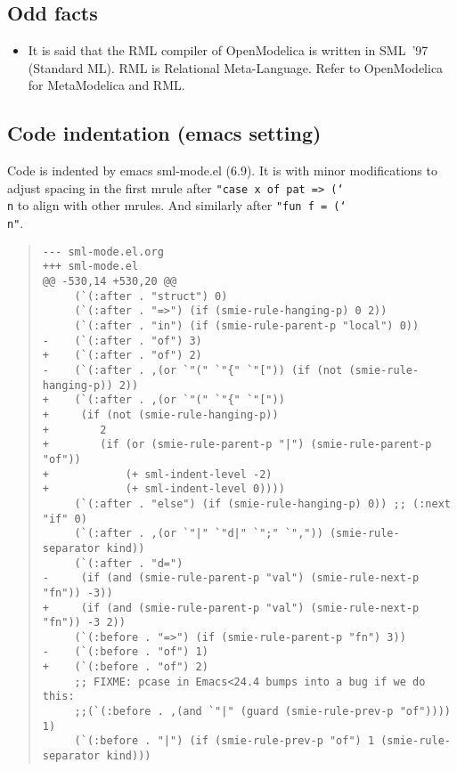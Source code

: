 \documentclass[10pt,b5paper]{article}
\begin{document}
\subsection{Odd facts}

\begin{itemize}

\item It is said that the RML compiler of OpenModelica is written in
SML~'97 (Standard ML).  RML is Relational Meta-Language.  Refer to
OpenModelica for MetaModelica and RML.

\end{itemize}

\subsection{Code indentation (emacs setting)}

Code is indented by emacs sml-mode.el (6.9).  It is with minor
modifications to adjust spacing in the first mrule after
{\tt{}"case~x~of~pat~=>~({\char`\\}n} to align with other mrules.  And
similarly after {\tt{}"fun~f~=~({\char`\\}n"}.

\begin{quote}
\small
\begin{lstlisting}[aboveskip=-\baselineskip]
--- sml-mode.el.org
+++ sml-mode.el
@@ -530,14 +530,20 @@
     (`(:after . "struct") 0)
     (`(:after . "=>") (if (smie-rule-hanging-p) 0 2))
     (`(:after . "in") (if (smie-rule-parent-p "local") 0))
-    (`(:after . "of") 3)
+    (`(:after . "of") 2)
-    (`(:after . ,(or `"(" `"{" `"[")) (if (not (smie-rule-hanging-p)) 2))
+    (`(:after . ,(or `"(" `"{" `"["))
+     (if (not (smie-rule-hanging-p))
+        2
+        (if (or (smie-rule-parent-p "|") (smie-rule-parent-p "of"))
+            (+ sml-indent-level -2)
+            (+ sml-indent-level 0))))
     (`(:after . "else") (if (smie-rule-hanging-p) 0)) ;; (:next "if" 0)
     (`(:after . ,(or `"|" `"d|" `";" `",")) (smie-rule-separator kind))
     (`(:after . "d=")
-     (if (and (smie-rule-parent-p "val") (smie-rule-next-p "fn")) -3))
+     (if (and (smie-rule-parent-p "val") (smie-rule-next-p "fn")) -3 2))
     (`(:before . "=>") (if (smie-rule-parent-p "fn") 3))
-    (`(:before . "of") 1)
+    (`(:before . "of") 2)
     ;; FIXME: pcase in Emacs<24.4 bumps into a bug if we do this:
     ;;(`(:before . ,(and `"|" (guard (smie-rule-prev-p "of")))) 1)
     (`(:before . "|") (if (smie-rule-prev-p "of") 1 (smie-rule-separator kind)))
\end{lstlisting}
\end{quote}







\appendix
\end{document}

